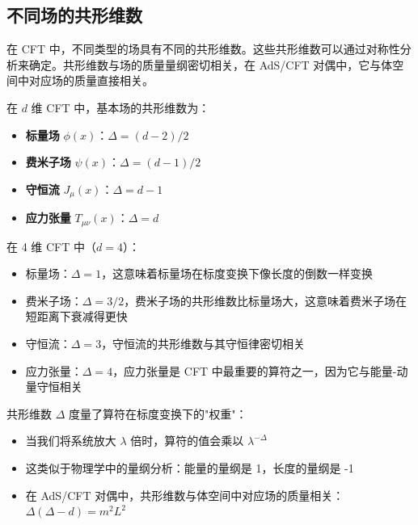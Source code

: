 \subsection{不同场的共形维数}

\begin{note}[物理动机]
在 CFT 中，不同类型的场具有不同的共形维数。这些共形维数可以通过对称性分析来确定。共形维数与场的质量量纲密切相关，在 AdS/CFT 对偶中，它与体空间中对应场的质量直接相关。
\end{note}

\begin{property}[基本场的共形维数]
在 $d$ 维 CFT 中，基本场的共形维数为：
\begin{itemize}
    \item \textbf{标量场} $\phi(x)$：$\Delta = (d-2)/2$
    \item \textbf{费米子场} $\psi(x)$：$\Delta = (d-1)/2$
    \item \textbf{守恒流} $J_\mu(x)$：$\Delta = d-1$
    \item \textbf{应力张量} $T_{\mu\nu}(x)$：$\Delta = d$
\end{itemize}
\end{property}

\begin{example}
在 4 维 CFT 中（$d=4$）：
\begin{itemize}
    \item 标量场：$\Delta = 1$，这意味着标量场在标度变换下像长度的倒数一样变换
    \item 费米子场：$\Delta = 3/2$，费米子场的共形维数比标量场大，这意味着费米子场在短距离下衰减得更快
    \item 守恒流：$\Delta = 3$，守恒流的共形维数与其守恒律密切相关
    \item 应力张量：$\Delta = 4$，应力张量是 CFT 中最重要的算符之一，因为它与能量-动量守恒相关
\end{itemize}
\end{example}

\begin{note}[共形维数的物理意义]
共形维数 $\Delta$ 度量了算符在标度变换下的"权重"：
\begin{itemize}
    \item 当我们将系统放大 $\lambda$ 倍时，算符的值会乘以 $\lambda^{-\Delta}$
    \item 这类似于物理学中的量纲分析：能量的量纲是 1，长度的量纲是 -1
    \item 在 AdS/CFT 对偶中，共形维数与体空间中对应场的质量相关：$\Delta(\Delta-d) = m^2 L^2$ \cite{Gubser1998}
\end{itemize}
\end{note}

